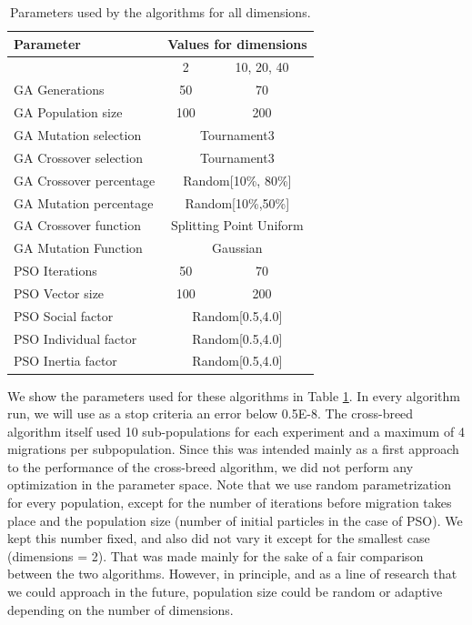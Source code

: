 \documentclass[runningheads]{llncs}
\begin{document}
   \begin{table}[h!tp]
    \caption{Parameters used by the algorithms for all dimensions.}
    \label{table:ga-pso-parameters}
    \centering
    \begin{tabular}{|l|c|c|}
    \hline
    Parameter & \multicolumn{2}{c|}{Values for dimensions} \\
      \hline
      & 2 & 10, 20, 40 \\
    \hline
    GA Generations & 50 &  70\\
    \hline
     GA Population size & 100 & 200\\
    \hline
    GA Mutation selection &  \multicolumn{2}{c|}{Tournament3}\\
    \hline
    GA Crossover selection & \multicolumn{2}{c|}{Tournament3} \\
    \hline
    GA Crossover percentage & \multicolumn{2}{c|}{Random[10\%, 80\%]} \\
    \hline
    GA Mutation percentage & \multicolumn{2}{c|}{Random[10\%,50\%]} \\
    \hline
    GA Crossover function & \multicolumn{2}{c|}{Splitting Point Uniform} \\
    \hline
    GA Mutation Function & \multicolumn{2}{c|}{Gaussian} \\
      \hline 
      \hline
    PSO Iterations & 50 & 70\\
    \hline
    PSO Vector size & 100 & 200\\
    \hline
    PSO Social factor & \multicolumn{2}{c|}{Random[0.5,4.0]} \\
    \hline
    PSO Individual factor & \multicolumn{2}{c|}{Random[0.5,4.0]} \\
    \hline
    PSO Inertia factor & \multicolumn{2}{c|}{Random[0.5,4.0]} \\
    \hline
    \end{tabular}
\end{table}

We show the parameters used for these algorithms in Table
\ref{table:ga-pso-parameters}. In every algorithm run, we will use as a
stop criteria an error below 0.5E-8. The cross-breed algorithm
itself used 10 sub-populations for each
experiment and a maximum of 4 migrations per subpopulation.
Since this was intended mainly as a first approach to the performance of the cross-breed algorithm, we
did not perform any optimization in the parameter space. Note
that we use random parametrization for every population, except for
the number of iterations before migration takes place and 
the population size (number of initial particles in the case of PSO). 
We kept this number fixed, and also did not vary it except for the smallest case
(dimensions = 2). That was made mainly for the sake of a fair
comparison between the two algorithms. However, in principle, and as a line of
research that we could approach in the future, population size could be
random or adaptive depending on the number of dimensions.
\end{document}
